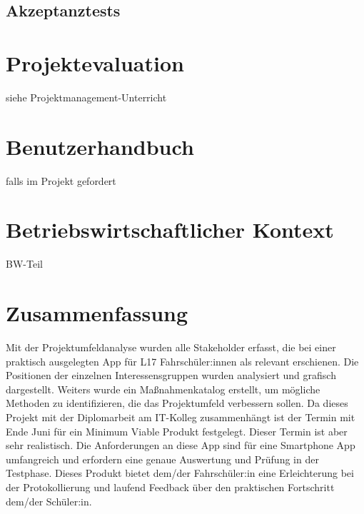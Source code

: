 \section{Akzeptanztests}

\chapter{Projektevaluation}
siehe Projektmanagement-Unterricht

\chapter{Benutzerhandbuch}
falls im Projekt gefordert

\chapter{Betriebswirtschaftlicher Kontext}
BW-Teil

\chapter{Zusammenfassung}
Mit der Projektumfeldanalyse wurden alle Stakeholder erfasst, die bei einer praktisch ausgelegten App für L17 Fahrschüler:innen als relevant erschienen. Die Positionen der einzelnen Interessensgruppen wurden analysiert und grafisch dargestellt. Weiters wurde ein Maßnahmenkatalog erstellt, um mögliche Methoden zu identifizieren, die das Projektumfeld verbessern sollen. Da dieses Projekt mit der Diplomarbeit am IT-Kolleg zusammenhängt ist der Termin mit Ende Juni für ein Minimum Viable Produkt festgelegt. Dieser Termin ist aber sehr realistisch. Die Anforderungen an diese App sind für eine Smartphone App umfangreich und erfordern eine genaue Auswertung und Prüfung in der Testphase. Dieses Produkt bietet dem/der Fahrschüler:in eine Erleichterung bei der Protokollierung und laufend Feedback über den praktischen Fortschritt dem/der Schüler:in.